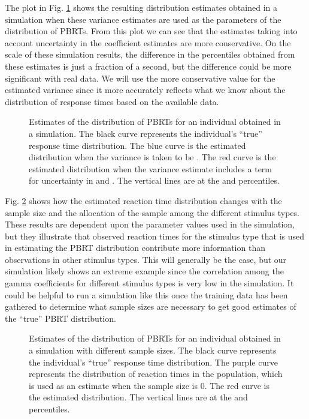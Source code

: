 \documentclass[conference]{IEEEtran}
\begin{document}
The plot in Fig. \ref{fig:SimRTDistEst} shows the resulting distribution estimates obtained in a simulation when these variance estimates are used as the parameters of the distribution of PBRTs.  From this plot we can see that the estimates taking into account uncertainty in the coefficient estimates are more conservative.  On the scale of these simulation results, the difference in the percentiles obtained from these estimates is just a fraction of a second, but the difference could be more significant with real data.  We will use the more conservative value for the estimated variance since it more accurately reflects what we know about the distribution of response times based on the available data.
\begin{figure}[!t]
	\centering
{}
\caption{Estimates of the distribution of PBRTs for an individual obtained in a simulation.  The black curve represents the individual's ``true'' response time distribution.  The blue curve is the estimated distribution when the variance is taken to be .  The red curve is the estimated distribution when the variance estimate includes a term for uncertainty in  and .  The vertical lines are at the  and  percentiles.}
\label{fig:SimRTDistEst}
\end{figure}

Fig. \ref{fig:SimRTDistEstvsSampleSize} shows how the estimated reaction time distribution changes with the sample size and the allocation of the sample among the different stimulus types.  These results are dependent upon the parameter values used in the simulation, but they illustrate that observed reaction times for the stimulus type that is used in estimating the PBRT distribution contribute more information than observations in other stimulus types.  This will generally be the case, but our simulation likely shows an extreme example since the correlation among the gamma coefficients for different stimulus types is very low in the simulation.  It could be helpful to run a simulation like this once the training data has been gathered to determine what sample sizes are necessary to get good estimates of the ``true'' PBRT distribution.
\begin{figure}[!t]
	\centering
{}
\caption{Estimates of the distribution of PBRTs for an individual obtained in a simulation with different sample sizes.  The black curve represents the individual's ``true'' response time distribution.  The purple curve represents the distribution of reaction times in the population, which is used as an estimate when the sample size is 0.  The red curve is the estimated distribution.  The vertical lines are at the  and  percentiles.}
\label{fig:SimRTDistEstvsSampleSize}
\end{figure}
\end{document}
